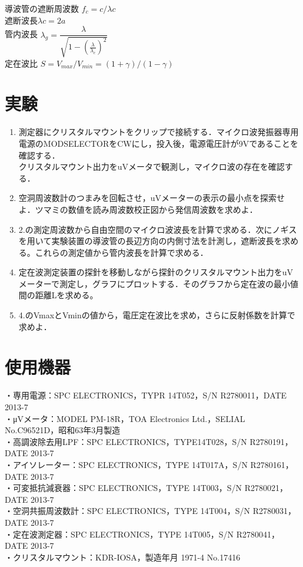導波管の遮断周波数 $f_c=c/\lambda c$\\
遮断波長$\lambda c = 2a$\\
管内波長 $\lambda_g = \dfrac{\lambda}{\sqrt{1-(\frac{\lambda}{\lambda_c})^2}}$\\
定在波比 $S=V_{max}/V_{min}=(1+\gamma)/(1-\gamma)$\\

\section{実験\label{jikken}}
\begin{enumerate}
    \item 測定器にクリスタルマウントをクリップで接続する．マイクロ波発振器専用電源のMODSELECTORをCWにし，投入後，電源電圧計が9Vであることを確認する．\\
    クリスタルマウント出力をuVメータで観測し，マイクロ波の存在を確認する．\\

    \item 空洞周波数計のつまみを回転させ，uVメーターの表示の最小点を探索せよ．ツマミの数値を読み周波数校正図から発信周波数を求めよ．\\

    \item 2.の測定周波数から自由空間のマイクロ波波長を計算で求める．次にノギスを用いて実験装置の導波管の長辺方向の内側寸法を計測し，遮断波長を求める。これらの測定値から管内波長を計算で求める．\\

    \item 定在波測定装置の探針を移動しながら探針のクリスタルマウント出力をuVメーターで測定し，グラフにプロットする．そのグラフから定在波の最小値間の距離Lを求める。\\

    \item 4.のVmaxとVminの値から，電圧定在波比を求め，さらに反射係数を計算で求めよ．\\
  \end{enumerate}

\newpage
\section{使用機器\label{kiki}}
・専用電源：SPC ELECTRONICS，TYPR 14T052，S/N R2780011，DATE 2013-7\\
・μVメータ：MODEL PM-18R，TOA Electronics Ltd.，SELIAL No.C96521D，昭和63年3月製造\\
・高調波除去用LPF：SPC ELECTRONICS，TYPE14T028，S/N R2780191，DATE 2013-7\\
・アイソレーター：SPC ELECTRONICS，TYPE 14T017A，S/N R2780161，DATE 2013-7\\
・可変抵抗減衰器：SPC ELECTRONICS，TYPE 14T003，S/N R2780021，DATE 2013-7\\
・空洞共振周波数計：SPC ELECTRONICS，TYPE 14T004，S/N R2780031，DATE 2013-7\\
・定在波測定器：SPC ELECTRONICS，TYPE 14T005，S/N R2780041，DATE 2013-7\\
・クリスタルマウント：KDR-IOSA，製造年月 1971-4 No.17416

